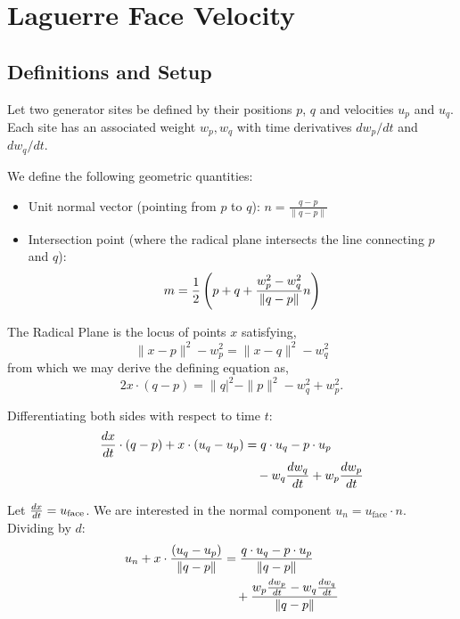 \documentclass[twocolumn]{aastex63}
\begin{document}
\section{Laguerre Face Velocity}\label{app:facevelocity}
\subsection{Definitions and Setup}

Let two generator sites be defined by their positions $p$, $q$ and velocities $u_p$ and $u_q$. Each site has an associated weight $w_p, w_q$ with time derivatives $dw_p/dt$ and $dw_q/dt$.

We define the following geometric quantities:
\begin{itemize}
    \item {Unit normal vector} (pointing from $p$ to $q$): ${n} = \frac{q-p}{\|q-p\|}$
    \item {Intersection point} (where the radical plane intersects the line connecting $p$ and $q$):
    \begin{equation}
        m = {1\over2}\left({{p} + {q}} + \frac{w_p^2 - w_q^2}{\|q-p\|} n\right)
    \end{equation}
\end{itemize}

The {Radical Plane} is  the locus of points $x$ satisfying,
\begin{equation}
   \|{x} - {p}\|^2 - w_p^2 = \|{x} - {q}\|^2 - w_q^2
\end{equation}
from which we may derive the defining equation as,
\begin{equation}
    2{x} \cdot ({q} - {p}) = \|{q}|^2 - \|{p}\|^2 - w_q^2 + w_p^2.
\end{equation}

Differentiating both sides with respect to time $t$:
\begin{equation}
    \begin{aligned}
    {dx\over dt} \cdot ({q} - {p})
      + {x} \cdot ({u}_q - {u}_p)
    &={q} \cdot {u}_q - {p} \cdot {u}_p\\
    &\quad-w_q{dw_q\over dt } + w_p {dw_p\over dt}
    \end{aligned}
\end{equation}

Let ${dx\over dt} = {u}_\textrm{face}$. We are interested in the normal component $u_n = {u}_\textrm{face} \cdot {n}$. Dividing by $d$:
\begin{equation}
    \begin{aligned}
    u_n + {x} \cdot \frac{({u}_q - u_p)}{\|q-p\|}
    &= \frac{{q} \cdot {u}_q - {p} \cdot {u}_p}{\|q-p\|}\\
    &\quad+\frac{w_p{dw_p\over dt} - w_q{dw_q\over dt}}{\|q-p\|}
    \end{aligned}
\end{equation}
\end{document}
